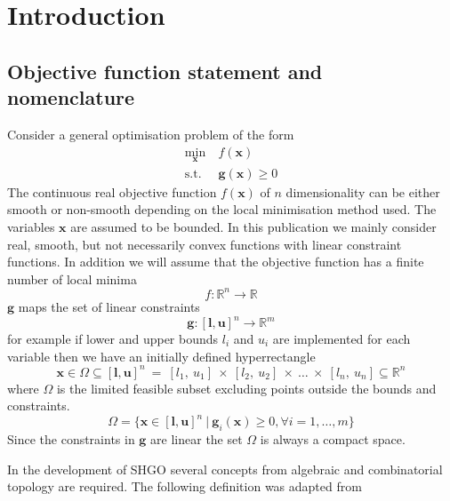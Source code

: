 \section{Introduction}
\subsection{Objective function statement and nomenclature}
Consider a general optimisation problem of the form
\begin{align} \nonumber
\underset{\mathbf{x}}{\textrm{min}} ~&f (\mathbf{x}) \\
\textrm{s.t.}~ &\mathbf{g} (\mathbf{x}) \geq 0
\end{align}
The continuous real objective function $f(\mathbf{x})$ of $n$ dimensionality can be either smooth or non-smooth depending on the local minimisation method used. The variables $\mathbf{x}$ are assumed to be bounded. In this publication we mainly consider real, smooth, but not necessarily convex functions with linear constraint functions. In addition we will assume that the objective function has a finite number of local minima
\begin{equation} \label{eq:objfun}
f : \mathbb{R}^n \rightarrow \mathbb{R}
\end{equation}
$\mathbf{g}$ maps the set of linear constraints
\begin{equation} \label{eq:gcons}
\mathbf{g} :  [\mathbf{l}, \mathbf{u}]^n  \rightarrow \mathbb{R}^m
\end{equation}
for example if lower and upper bounds $l_i$ and $u_i$ are implemented for each variable then we have an initially defined hyperrectangle 
\begin{equation}
\mathbf{x} \in \Omega \subseteq  [\mathbf{l}, \mathbf{u}]^n~=~[l_1,~u_1]~\times~[l_2,~u_2] ~\times~\dots~\times~[l_n,~u_n] \subseteq  \mathbb{R}^n
\end{equation}
 where $\Omega$ is the limited feasible subset excluding points outside the bounds and constraints. 
\begin{equation} \label{eq:omega}
\Omega = \{ \mathbf{x} \in   [\mathbf{l}, \mathbf{u}]^n ~|~ \mathbf{g}_i (\mathbf{x} ) \geq 0, \forall i =1, \dots, m\}
\end{equation}
Since the constraints in $\mathbf{g}$ are linear the set $\Omega$ is always a compact space.

In the development of SHGO several concepts from algebraic and combinatorial topology \cite{Henle1979} are required. The following definition was adapted from \citet[p. 9]{Hatcher2011} 

